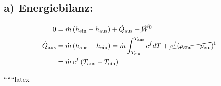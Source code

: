 \subsection*{a) Energiebilanz:}

\begin{align*}
0 &= \dot{m} \left( h_{\text{ein}} - h_{\text{aus}} \right) + \dot{Q}_{\text{aus}} + \cancel{\dot{W}}^0 \\
\dot{Q}_{\text{aus}} &= \dot{m} \left( h_{\text{aus}} - h_{\text{ein}} \right) = \dot{m} \int_{T_{\text{ein}}}^{T_{\text{aus}}} c^f dT + \cancel{v^f (p_{\text{aus}} - p_{\text{ein}})}^0 \\
&= \dot{m} \, c^f \left( T_{\text{aus}} - T_{\text{ein}} \right)
\end{align*}

``````latex